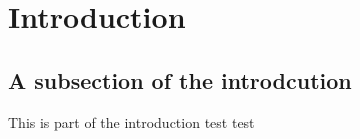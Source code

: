 \chapter{Introduction}

\section{A subsection of the introdcution}

This is part of the introduction test test